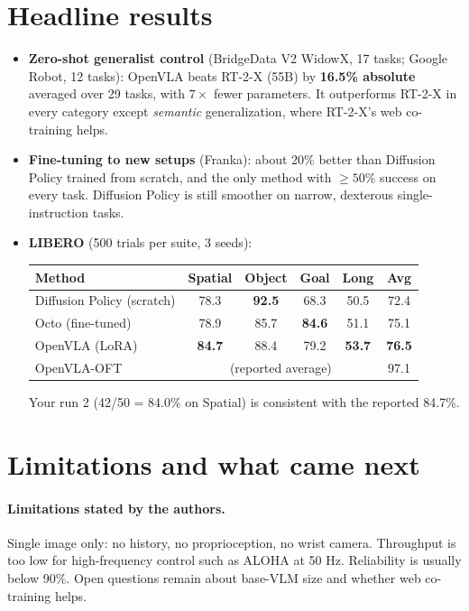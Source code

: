 \documentclass[11pt]{article}
\begin{document}
\section{Headline results}

\begin{itemize}
  \item \textbf{Zero-shot generalist control} (BridgeData V2 WidowX, 17 tasks; Google Robot, 12 tasks): OpenVLA beats RT-2-X (55B) by \textbf{16.5\% absolute} averaged over 29 tasks, with $7\times$ fewer parameters. It outperforms RT-2-X in every category except \emph{semantic} generalization, where RT-2-X's web co-training helps.
  \item \textbf{Fine-tuning to new setups} (Franka): about 20\% better than Diffusion Policy trained from scratch, and the only method with $\ge50\%$ success on every task. Diffusion Policy is still smoother on narrow, dexterous single-instruction tasks.
  \item \textbf{LIBERO} (500 trials per suite, 3 seeds):
\begin{center}
\begin{tabular}{@{}lccccc@{}}
\toprule
Method & Spatial & Object & Goal & Long & Avg \\
\midrule
Diffusion Policy (scratch) & 78.3 & \textbf{92.5} & 68.3 & 50.5 & 72.4 \\
Octo (fine-tuned) & 78.9 & 85.7 & \textbf{84.6} & 51.1 & 75.1 \\
OpenVLA (LoRA) & \textbf{84.7} & 88.4 & 79.2 & \textbf{53.7} & \textbf{76.5} \\
\midrule
OpenVLA-OFT & \multicolumn{4}{c}{(reported average)} & 97.1 \\
\bottomrule
\end{tabular}
\end{center}
Your run 2 (42/50 = 84.0\% on Spatial) is consistent with the reported 84.7\%.
\end{itemize}

\section{Limitations and what came next}
\label{sec:oft}

\paragraph{Limitations stated by the authors.} Single image only: no history, no proprioception, no wrist camera. Throughput is too low for high-frequency control such as ALOHA at 50 Hz. Reliability is usually below 90\%. Open questions remain about base-VLM size and whether web co-training helps.
\end{document}
